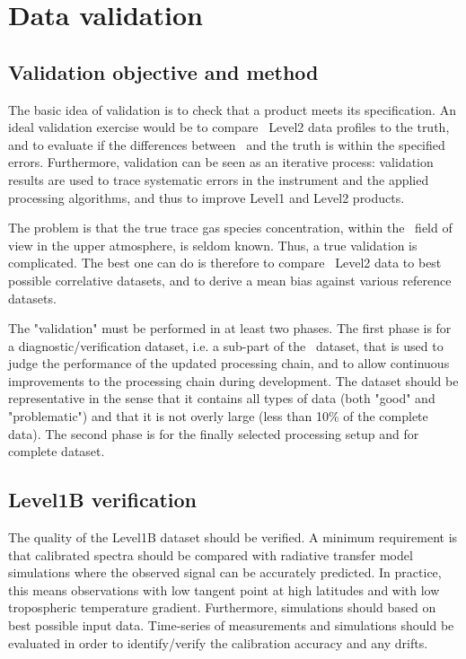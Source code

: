 \chapter{Data validation}
\label{validation}

\section{Validation objective and method}

The basic idea of validation is to check that a product  
meets its specification. An ideal validation exercise
would be to compare \smr\ Level2 data profiles to the truth,
and to evaluate if the differences between \smr\ and the 
truth is within the specified errors. Furthermore, validation can 
be seen as an iterative process: validation results are used to 
trace systematic errors in the instrument and the applied 
processing algorithms, and thus to improve Level1 and Level2 products.

The problem is that the true trace gas species concentration,
within the \smr\ field of view in the upper atmosphere, is seldom known. 
Thus, a true validation is complicated. The best one can do is therefore
to compare \smr\ Level2 data to best possible correlative datasets,
and to derive a mean bias against various reference datasets.

The "validation" must be performed in at least two phases.
The first phase is for a diagnostic/verification dataset, i.e. a sub-part 
of the \smr\ dataset, that is used to judge the performance of the 
updated processing chain, and to allow continuous improvements to the 
processing chain during development.
The dataset should be representative in the sense that it
contains all types of data (both "good" and "problematic") and
that it is not overly large (less than 10\(\%\) of the complete data).
The second phase is for the finally selected processing setup
and for complete dataset.



\section{Level1B verification}

The quality of the Level1B dataset should be verified.
A minimum requirement is that calibrated spectra should 
be compared with radiative transfer model simulations where 
the observed signal can be accurately predicted. 
In practice, this means observations with low tangent point 
at high latitudes and with low tropospheric temperature gradient. 
Furthermore, simulations should based on best possible input data.
Time-series of measurements and simulations should be evaluated
in order to identify/verify the calibration accuracy and any drifts. 


